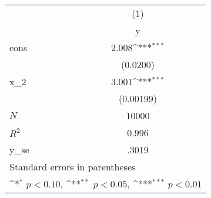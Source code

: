 {
\def\sym#1{\ifmmode^{#1}\else\(^{#1}\)\fi}
\begin{tabular}{l*{1}{c}}
\hline\hline
            &\multicolumn{1}{c}{(1)}\\
            &\multicolumn{1}{c}{y}\\
\hline
cons        &       2.008\sym{***}\\
            &    (0.0200)         \\
[1em]
x\_2         &       3.001\sym{***}\\
            &   (0.00199)         \\
\hline
\(N\)       &       10000         \\
\(R^{2}\)   &       0.996         \\
y\_se        &       .3019         \\
\hline\hline
\multicolumn{2}{l}{\footnotesize Standard errors in parentheses}\\
\multicolumn{2}{l}{\footnotesize \sym{*} \(p<0.10\), \sym{**} \(p<0.05\), \sym{***} \(p<0.01\)}\\
\end{tabular}
}
